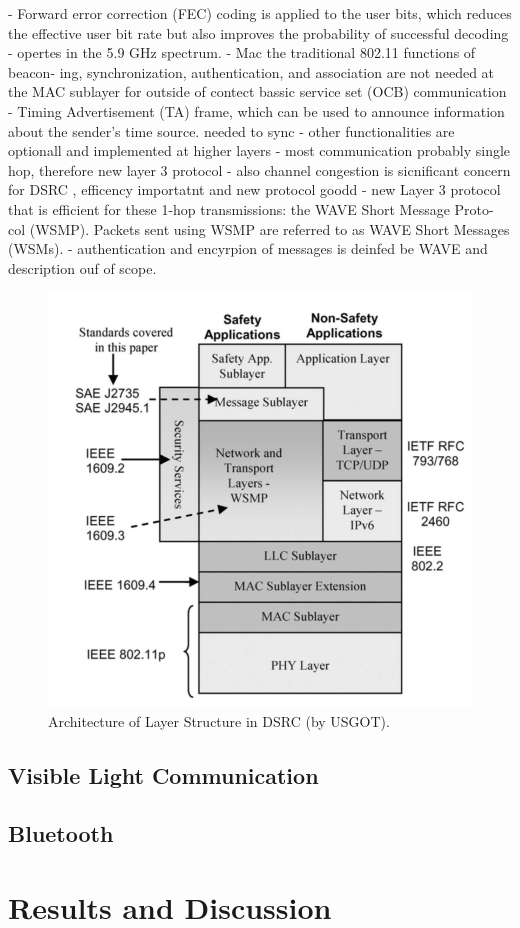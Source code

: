 \documentclass[conference,12pt,onecolumn]{IEEEtran}
\begin{document}
- Forward error correction (FEC) coding is applied to the user bits, which reduces the effective user bit rate but also improves the probability of successful decoding
- opertes in the 5.9 GHz spectrum.
- Mac the traditional 802.11 functions of beacon- ing, synchronization, authentication, and association are not needed at the MAC sublayer for outside of contect bassic service set (OCB) communication
- Timing Advertisement (TA) frame, which can be used to announce information about the sender’s time source. needed to sync
- other functionalities are optionall and implemented at higher layers \cite{kenney2011}
- most communication probably single hop, therefore new layer 3 protocol\cite{kenney2011}
- also channel congestion is sicnificant concern for DSRC \cite{machardy2018}, efficency importatnt and new protocol goodd
- new Layer 3 protocol that is efficient for these 1-hop transmissions: the WAVE Short Message Proto- col (WSMP). Packets sent using WSMP are referred to as WAVE Short Messages (WSMs).
- authentication and encyrpion of messages is deinfed be WAVE and description ouf of scope.

\begin{figure} [h]
   \centering
  \includegraphics[width=0.5\linewidth]{_Graphics/layer_architecture_dsrc.png}
  \caption{Architecture of Layer Structure in DSRC (by USGOT). \cite{kenney2011}}
  \label{fig:boat1}
\end{figure}

\subsection{Visible Light Communication}
\subsection{Bluetooth}

\section{Results and Discussion}
\end{document}

